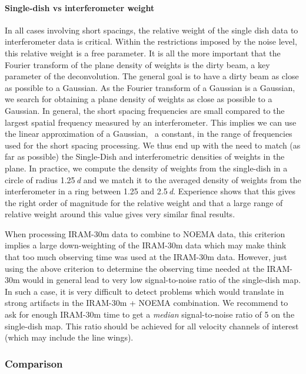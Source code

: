 \paragraph{Single-dish vs interferometer weight}

In all cases involving short spacings, the relative weight of the single
dish data to interferometer data is critical. Within the restrictions
imposed by the noise level, this relative weight is a free parameter. It is
all the more important that the Fourier transform of the \uv{} plane
density of weights is the dirty beam, a key parameter of the deconvolution.
The general goal is to have a dirty beam as close as possible to a
Gaussian. As the Fourier transform of a Gaussian is a Gaussian, we search
for obtaining a \uv{} plane density of weights as close as possible to a
Gaussian. In general, the short spacing frequencies are small compared to
the largest spatial frequency measured by an interferometer. This implies
we can use the linear approximation of a Gaussian, \ie\ a constant, in the
range of frequencies used for the short spacing processing. We thus end up
with the need to match (as far as possible) the Single-Dish and
interferometric densities of weights in the \uv{} plane. In practice, we
compute the density of weights from the single-dish in a \uv{} circle of
radius 1.25\,\textit{d} and we match it to the averaged density of weights from the
interferometer in a \uv{} ring between 1.25 and 2.5\,\textit{d}. Experience shows
that this gives the right order of magnitude for the relative weight and
that a large range of relative weight around this value gives very similar
final results.

When processing IRAM-30m data to combine to NOEMA data, this criterion
implies a large down-weighting of the IRAM-30m data which may make think
that too much observing time was used at the IRAM-30m data. However, just
using the above criterion to determine the observing time needed at the
IRAM-30m would in general lead to very low signal-to-noise ratio of the
single-dish map. In such a case, it is very difficult to detect problems
which would translate in strong artifacts in the IRAM-30m + NOEMA
combination. We recommend to ask for enough IRAM-30m time to get a
\emph{median} signal-to-noise ratio of 5 on the single-dish map. This ratio
should be achieved for all velocity channels of interest (which may include
the line wings).

\subsubsection{Comparison}

